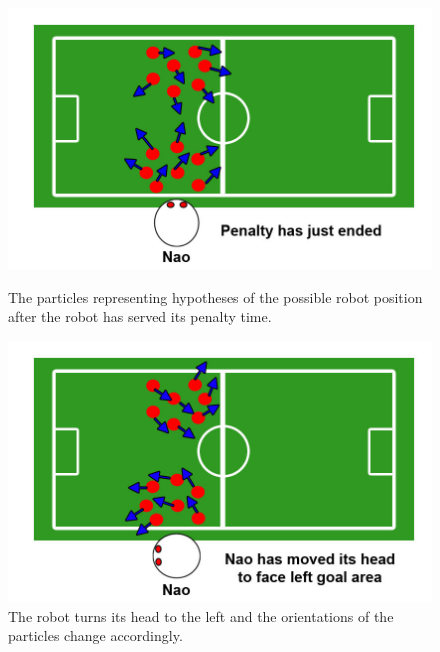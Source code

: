 \documentclass[11pt]{report}
\begin{document}
\begin{figure}[ht!]
\begin{minipage}[b]{0.5\linewidth}
\includegraphics[scale=0.2]{../Drawings/localisation/localisationAlgorithmPenaltyEnded.jpg}
\caption{The particles representing hypotheses of the possible robot position after the robot has served its penalty time.}
\label{fig:penaltyOver}
\end{minipage}
\hspace{0.5cm}
\begin{minipage}[b]{0.5\linewidth}
\includegraphics[scale=0.2]{../Drawings/localisation/localisationAlgorithmTurnedLeft.jpg}
\caption{The robot turns its head to the left and the orientations of the particles change accordingly.}
\label{fig:turnedLeft}
\end{minipage}
\end{figure}
\end{document}
